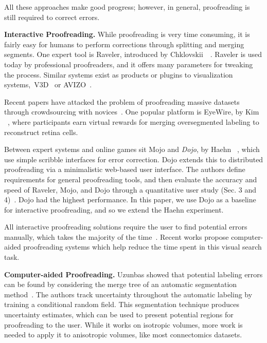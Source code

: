 All these approaches make good progress; however, in general, proofreading is still required to correct errors.


\textbf{Interactive Proofreading.} While proofreading is very time consuming, it is fairly easy for humans to perform corrections through splitting and merging segments. One expert tool is Raveler, introduced by Chklovskii~\etal~\cite{chklovskii2010, raveler}. Raveler is used today by professional proofreaders, and it offers many parameters for tweaking the process. Similar systems exist as products or plugins to visualization systems,~\eg V3D~\cite{proofreading_bottleneck} or AVIZO~\cite{markus_proofreading}. 

Recent papers have attacked the problem of proofreading massive datasets through crowdsourcing with novices~\cite{saalfeld09,anderson2011,Giuly2013DP2}. One popular platform is EyeWire, by Kim \etal~\cite{eyewire_nature}, where participants earn virtual rewards for merging oversegmented labeling to reconstruct retina cells.

Between expert systems and online games sit Mojo and \textit{Dojo}, by Haehn \etal~\cite{haehn_dojo_2014,Neuroblocks}, which use simple scribble interfaces for error correction. Dojo extends this to distributed proofreading via a minimalistic web-based user interface. The authors define requirements for general proofreading tools, and then evaluate the accuracy and speed of Raveler, Mojo, and Dojo through a quantitative user study (Sec. 3 and 4)~\cite{haehn_dojo_2014}. Dojo had the highest performance. In this paper, we use Dojo as a baseline for interactive proofreading, and so we extend the Haehn \etal experiment.

All interactive proofreading solutions require the user to find potential errors manually, which takes the majority of the time~\cite{proofreading_bottleneck,haehn_dojo_2014}. Recent works propose computer-aided proofreading systems which help reduce the time spent in this visual search task.

\textbf{Computer-aided Proofreading.} Uzunbas \etal showed that potential labeling errors can be found by considering the merge tree of an automatic segmentation method~\cite{uzunbas}. The authors track uncertainty throughout the automatic labeling by training a conditional random field. This segmentation technique produces uncertainty estimates, which can be used to present potential regions for proofreading to the user. While it works on isotropic volumes, more work is needed to apply it to anisotropic volumes, like most connectomics datasets.

